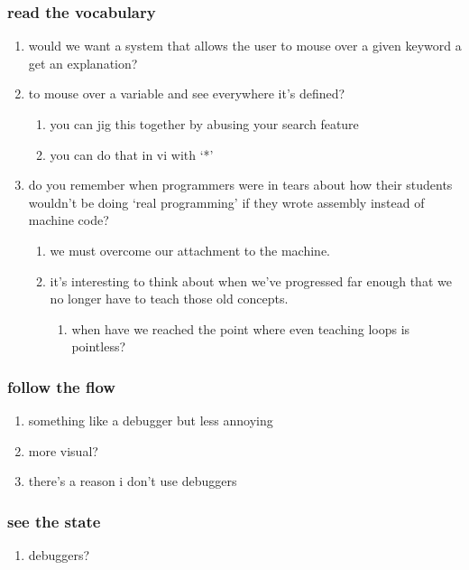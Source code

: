 \documentclass{article}
\begin{document}
	\subsubsection{read the vocabulary}
	\begin{enumerate}
		\item would we want a system that allows the user to mouse over a given keyword a get an explanation?
		\item to mouse over a variable and see everywhere it's defined?
		\begin{enumerate}
			\item you can jig this together by abusing your search feature
			\item you can do that in vi with `*'
		\end{enumerate}
		\item do you remember when programmers were in tears about how their students wouldn't be doing `real programming' if they wrote assembly instead of machine code?
		\begin{enumerate}
			\item we must overcome our attachment to the machine.
			\item it's interesting to think about when we've progressed far enough that we no longer have to teach those old concepts.
			\begin{enumerate}
				\item when have we reached the point where even teaching loops is pointless?
			\end{enumerate}
		\end{enumerate}
	\end{enumerate}
	\subsubsection{follow the flow}
	\begin{enumerate}
		\item something like a debugger but less annoying
		\item more visual?
		\item there's a reason i don't use debuggers
	\end{enumerate}
	\subsubsection{see the state}
	\begin{enumerate}
		\item debuggers?
	\end{enumerate}
\end{document}
